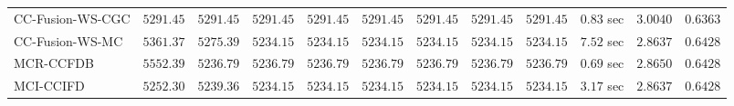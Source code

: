 \begin{table}[H]
\begin{tabular}{lrrrrrrrrrrr}
    CC-Fusion-WS-CGC & $      5291.45$ & $      5291.45$ & $      5291.45$ & $      5291.45$ & $      5291.45$ & $      5291.45$ & $      5291.45$ & $      5291.45$ & $         0.83$ sec    & $       3.0040$  & $       0.6363$ \\ 
     CC-Fusion-WS-MC & $      5361.37$ & $      5275.39$ & $      5234.15$ & $      5234.15$ & $      5234.15$ & $      5234.15$ & $      5234.15$ & $      5234.15$ & $         7.52$ sec    & $       2.8637$  & $       0.6428$ \\ 
\cmidrule{1-1} 
           MCR-CCFDB & $      5552.39$ & $      5236.79$ & $      5236.79$ & $      5236.79$ & $      5236.79$ & $      5236.79$ & $      5236.79$ & $      5236.79$ & $         0.69$ sec    & $       2.8650$  & $       0.6428$ \\ 
\cmidrule{1-1} 
           MCI-CCIFD & $      5252.30$ & $      5239.36$ & $      5234.15$ & $      5234.15$ & $      5234.15$ & $      5234.15$ & $      5234.15$ & $      5234.15$ & $         3.17$ sec    & $       2.8637$  & $       0.6428$ \\ 
\bottomrule
\end{tabular}
\end{table}

